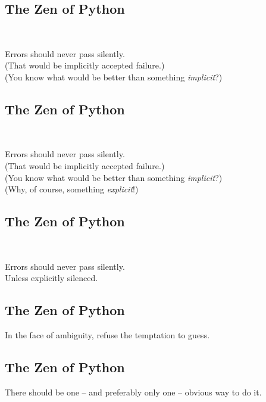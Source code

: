\documentclass[xga]{xdvislides}
\begin{document}
\subsection{The Zen of Python}
\\
\begin{center}
    Errors should never pass silently. \\
\addvspace{.2in}
	\small
	(That would be implicitly accepted failure.) \\
\addvspace{.2in}
	(You know what would be better than something {\em implicit}?)
\end{center}

\subsection{The Zen of Python}
\\
\begin{center}
    Errors should never pass silently. \\
\addvspace{.2in}
	\small
	(That would be implicitly accepted failure.) \\
\addvspace{.2in}
	(You know what would be better than something {\em implicit}?) \\
\addvspace{.2in}
	(Why, of course, something {\em explicit}!)
\end{center}

\subsection{The Zen of Python}
\\
\begin{center}
    Errors should never pass silently. \\
\addvspace{.5in}
    Unless explicitly silenced.
\end{center}

\subsection{The Zen of Python}
\begin{center}
    In the face of ambiguity, refuse the temptation to guess.
\end{center}

\subsection{The Zen of Python}
\begin{center}
    There should be one -- and preferably only one -- obvious way to do it.
\end{center}
\end{document}
